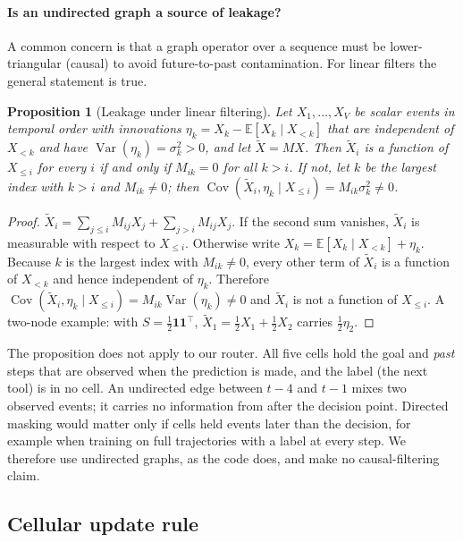 \documentclass[10pt]{article}
\newtheorem{proposition}{Proposition}
\begin{document}
\paragraph{Is an undirected graph a source of leakage?} A common concern is that a graph operator over a sequence must be lower-triangular (causal) to avoid future-to-past contamination. For linear filters the general statement is true.
\begin{proposition}[Leakage under linear filtering]\label{prop:leakage}
Let $X_1,\dots,X_V$ be scalar events in temporal order with innovations $\eta_k = X_k - \mathbb{E}[X_k \mid X_{<k}]$ that are independent of $X_{<k}$ and have $\operatorname{Var}(\eta_k)=\sigma_k^2>0$, and let $\tilde X = MX$. Then $\tilde X_i$ is a function of $X_{\le i}$ for every $i$ if and only if $M_{ik}=0$ for all $k>i$. If not, let $k$ be the largest index with $k>i$ and $M_{ik}\ne0$; then $\operatorname{Cov}(\tilde X_i, \eta_k \mid X_{\le i}) = M_{ik}\sigma_k^2 \ne 0$.
\end{proposition}
\begin{proof}
$\tilde X_i = \sum_{j\le i} M_{ij}X_j + \sum_{j>i} M_{ij}X_j$. If the second sum vanishes, $\tilde X_i$ is measurable with respect to $X_{\le i}$. Otherwise write $X_k = \mathbb{E}[X_k\mid X_{<k}] + \eta_k$. Because $k$ is the largest index with $M_{ik}\neq 0$, every other term of $\tilde X_i$ is a function of $X_{<k}$ and hence independent of $\eta_k$. Therefore $\operatorname{Cov}(\tilde X_i,\eta_k\mid X_{\le i}) = M_{ik}\operatorname{Var}(\eta_k) \neq 0$ and $\tilde X_i$ is not a function of $X_{\le i}$. A two-node example: with $S = \tfrac12\mathbf{1}\mathbf{1}^\top$, $\tilde X_1 = \tfrac12 X_1 + \tfrac12 X_2$ carries $\tfrac12\eta_2$.
\end{proof}
The proposition does not apply to our router. All five cells hold the goal and \emph{past} steps that are observed when the prediction is made, and the label (the next tool) is in no cell. An undirected edge between $t{-}4$ and $t{-}1$ mixes two observed events; it carries no information from after the decision point. Directed masking would matter only if cells held events later than the decision, for example when training on full trajectories with a label at every step. We therefore use undirected graphs, as the code does, and make no causal-filtering claim.

\subsection{Cellular update rule}\label{sec:update}
\end{document}
